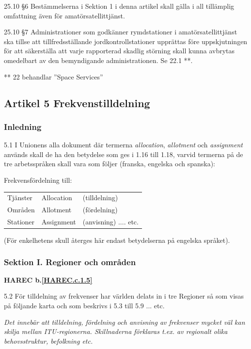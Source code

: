 25.10 \S6 Bestämmelserna i Sektion 1 i denna artikel skall gälla i all
tillämplig omfattning även för amatörsatellittjänst.
\cite[25.10]{ITU-RR}

25.10 \S7 Administrationer som godkänner rymdstationer i amatörsatellittjänst
ska tillse att tillfredsställande jordkontrollstationer upprättas före
uppskjutningen för att säkerställa att varje rapporterad skadlig störning
skall kunna avbrytas omedelbart av den bemyndigande administrationen.
Se 22.1 **.
\cite[25.11]{ITU-RR}

** 22 behandlar ''Space Services''

\subsection{Artikel 5 Frekvenstilldelning}

\subsubsection{Inledning}

5.1 I Unionens alla dokument där termerna \emph{allocation},
\emph{allotment} och \emph{assignment} används skall de ha den
betydelse som ges i 1.16 till 1.18, varvid termerna på de tre
arbetsspråken skall vara som följer (franska, engelska och spanska):
\cite[5.1]{ITU-RR}

Frekvensfördelning till:
\begin{tabular}{lll}
  Tjänster & Allocation & (tilldelning) \\
  Områden & Allotment & (fördelning) \\
  Stationer & Assignment & (anvisning) .... etc. \\
\end{tabular}

(För enkelhetens skull återges här endast betydelserna på engelska språket).

\subsubsection{Sektion I. Regioner och områden}
\textbf{
HAREC b.\ref{HAREC.c.1.5}\label{myHAREC.c.1.5}
}

5.2 För tilldelning av frekvenser har världen delats in i tre
Regioner så som visas på följande karta och som beskrivs i 5.3 till
5.9 ... etc.
\cite[5.2]{ITU-RR}

\emph{ Det innebär att tilldelning, fördelning och anvisning av frekvenser
  mycket väl kan skilja mellan ITU-regionerna.
  Skillnaderna förklaras t.ex. av regionalt olika behovsstruktur, befolkning
  etc.}

